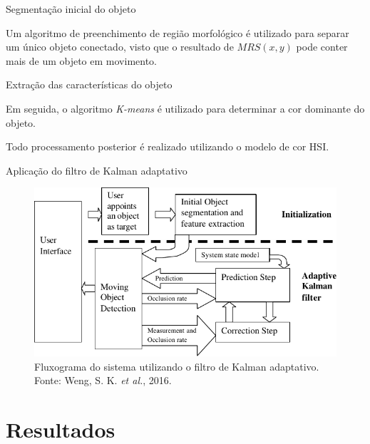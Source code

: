 \documentclass[10pt]{beamer}
\begin{document}
\begin{frame}{Segmentação inicial do objeto}

	Um algoritmo de preenchimento de região morfológico é utilizado para separar um único objeto conectado, visto que o resultado de $MRS(x, y)$ pode conter mais de um objeto em movimento.

\end{frame}

\begin{frame}{Extração das características do objeto}

	Em seguida, o algoritmo \textit{K-means} é utilizado para determinar a cor dominante do objeto.
	
	Todo processamento posterior é realizado utilizando o modelo de cor HSI.

\end{frame}

\begin{frame}{Aplicação do filtro de Kalman adaptativo}
	\begin{figure}[H]
		\label{fig:flowchart}
		\includegraphics[scale=0.8]{images/flowchart.pdf}
		\caption{Fluxograma do sistema utilizando o filtro de Kalman adaptativo. Fonte: Weng, S. K. \textit{et al.}, 2016.}
	\end{figure}
\end{frame}

\section{Resultados}
\end{document}

